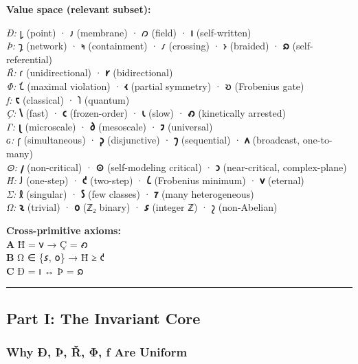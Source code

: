 \documentclass[12pt,a4paper]{article}
\begin{document}
\textbf{Value space (relevant subset):}

\emph{Ð:} 𐑛 (point) · 𐑨 (membrane) · 𐑼 (field) · \textbf{𐑦}
(self-written)\\
\emph{Þ:} 𐑡 (network) · 𐑰 (containment) · 𐑥 (crossing) · 𐑶 (braided) ·
\textbf{𐑸} (self-referential)\\
\emph{Ř:} 𐑩 (unidirectional) · \textbf{𐑾} (bidirectional)\\
\emph{Φ:} 𐑗 (maximal violation) · \textbf{𐑬} (partial symmetry) · 𐑹
(Frobenius gate)\\
\emph{ƒ:} \textbf{𐑱} (classical) · 𐑐 (quantum)\\
\emph{Ç:} \textbf{𐑘} (fast) · \textbf{𐑤} (frozen-order) · \textbf{𐑧}
(slow) · \textbf{𐑺} (kinetically arrested)\\
\emph{Γ:} \textbf{𐑚} (microscale) · \textbf{𐑔} (mesoscale) · \textbf{𐑲}
(universal)\\
\emph{ɢ:} 𐑝 (simultaneous) · \textbf{𐑜} (disjunctive) · \textbf{𐑠}
(sequential) · \textbf{𐑵} (broadcast, one-to-many)\\
\emph{⊙:} \textbf{𐑢} (non-critical) · \textbf{⊙} (self-modeling
critical) · \textbf{𐑮} (near-critical, complex-plane)\\
\emph{Ħ:} 𐑓 (one-step) · \textbf{𐑒} (two-step) · \textbf{𐑖} (Frobenius
minimum) · \textbf{𐑫} (eternal)\\
\emph{Σ:} 𐑙 (singular) · \textbf{𐑕} (few classes) · \textbf{𐑳} (many
heterogeneous)\\
\emph{Ω:} \textbf{𐑷} (trivial) · \textbf{𐑴} (ℤ₂ binary) · \textbf{𐑭}
(integer ℤ) · 𐑟 (non-Abelian)

\textbf{Cross-primitive axioms:}\\
\textbf{A} Ħ = 𐑫 → Ç = 𐑺\\
\textbf{B} Ω ∈ \{𐑭, 𐑴\} → Ħ ≥ 𐑒\\
\textbf{C} Ð = 𐑦 ↔ Þ = 𐑸

\begin{center}\rule{0.5\linewidth}{0.5pt}\end{center}

\hypertarget{part-i-the-invariant-core}{%
\subsection{Part I: The Invariant
Core}\label{part-i-the-invariant-core}}

\hypertarget{why-uxf0-uxfe-ux159-ux3c6-ux192-are-uniform}{%
\subsubsection{Why Ð, Þ, Ř, Φ, ƒ Are
Uniform}\label{why-uxf0-uxfe-ux159-ux3c6-ux192-are-uniform}}
\end{document}
